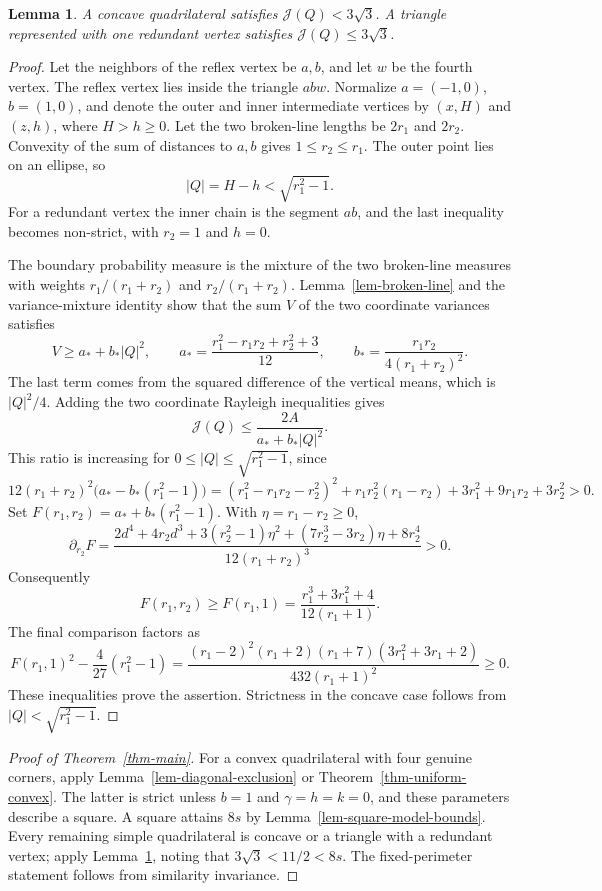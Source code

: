 \documentclass[11pt]{amsart}
\newtheorem{lemma}[theorem]{Lemma}
\theoremstyle{remark}\newtheorem{remark}[theorem]{Remark}
\numberwithin{equation}{section}
\begin{document}
\begin{lemma}\label{lem-concave}
A concave quadrilateral satisfies $\mathcal J(Q)<3\sqrt3$.
A triangle represented with one redundant vertex satisfies
$\mathcal J(Q)\le3\sqrt3$.
\end{lemma}
\begin{proof}
Let the neighbors of the reflex vertex be $a,b$, and let $w$ be the fourth
vertex. The reflex vertex lies inside the triangle $abw$. Normalize
$a=(-1,0)$, $b=(1,0)$, and denote the outer and inner intermediate vertices
by $(x,H)$ and $(z,h)$, where $H>h\ge0$. Let the two broken-line lengths
be $2r_1$ and $2r_2$. Convexity of the sum of distances to $a,b$ gives
$1\le r_2\le r_1$. The outer point lies on an ellipse, so
\[
|Q|=H-h<\sqrt{r_1^2-1}.
\]
For a redundant vertex the inner chain is the segment $ab$, and the last
inequality becomes non-strict, with $r_2=1$ and $h=0$.

The boundary probability measure is the mixture of the two broken-line
measures with weights $r_1/(r_1+r_2)$ and $r_2/(r_1+r_2)$.
Lemma~\ref{lem-broken-line} and the variance-mixture identity show that the
sum $V$ of the two coordinate variances satisfies
\[
V\ge a_*+b_*|Q|^2,\qquad
a_*=\frac{r_1^2-r_1r_2+r_2^2+3}{12},\qquad
b_*=\frac{r_1r_2}{4(r_1+r_2)^2}.
\]
The last term comes from the squared difference of the vertical means,
which is $|Q|^2/4$. Adding the two coordinate Rayleigh inequalities gives
\[
\mathcal J(Q)\le\frac{2A}{a_*+b_*|Q|^2}.
\]
This ratio is increasing for $0\le |Q|\le\sqrt{r_1^2-1}$, since
\[
12(r_1+r_2)^2\bigl(a_*-b_*(r_1^2-1)\bigr)
=(r_1^2-r_1r_2-r_2^2)^2+r_1r_2^2(r_1-r_2)
+3r_1^2+9r_1r_2+3r_2^2>0.
\]
Set $F(r_1,r_2)=a_*+b_*(r_1^2-1)$. With $\eta=r_1-r_2\ge0$,
\[
\partial_{r_2}F=
\frac{2d^4+4r_2d^3+3(r_2^2-1)\eta^2+(7r_2^3-3r_2)\eta+8r_2^4}
{12(r_1+r_2)^3}>0.
\]
Consequently
\[
F(r_1,r_2)\ge F(r_1,1)=\frac{r_1^3+3r_1^2+4}{12(r_1+1)}.
\]
The final comparison factors as
\[
F(r_1,1)^2-\frac4{27}(r_1^2-1)
=\frac{(r_1-2)^2(r_1+2)(r_1+7)(3r_1^2+3r_1+2)}
{432(r_1+1)^2}\ge0.
\]
These inequalities prove the assertion. Strictness in the concave case follows from $|Q|<\sqrt{r_1^2-1}$.
\end{proof}

\begin{proof}[Proof of Theorem~\ref{thm-main}]
For a convex quadrilateral with four genuine corners, apply
Lemma~\ref{lem-diagonal-exclusion} or Theorem~\ref{thm-uniform-convex}. The latter is strict unless $b=1$ and $\gamma=h=k=0$, and these
parameters describe a square. A square attains $8s$ by
Lemma~\ref{lem-square-model-bounds}. Every remaining simple quadrilateral
is concave or a triangle with a redundant vertex; apply
Lemma~\ref{lem-concave}, noting that $3\sqrt3<11/2<8s$.
The fixed-perimeter statement follows from similarity invariance.
\end{proof}
\end{document}
